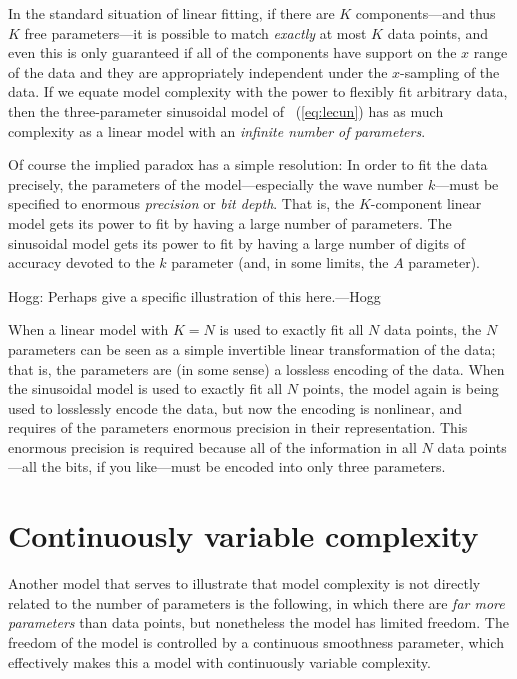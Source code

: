 \documentclass[12pt,twoside]{article}
\begin{document}
In the standard situation of linear fitting, if there are $K$
components---and thus $K$ free parameters---it is possible to match
\emph{exactly} at most $K$ data points, and even this is only
guaranteed if all of the components have support on the $x$ range of
the data and they are appropriately independent under the $x$-sampling
of the data.  If we equate model complexity with the power to flexibly
fit arbitrary data, then the three-parameter sinusoidal model of
\equationname~(\ref{eq:lecun}) has as much complexity as a linear
model with an \emph{infinite number of parameters}.

Of course the implied paradox has a simple resolution: In order to fit
the data precisely, the parameters of the model---especially the wave
number $k$---must be specified to enormous \emph{precision} or \emph{bit depth}.  That is,
the $K$-component linear model gets its power to fit by having a large
number of parameters.  The sinusoidal model gets its power to fit by
having a large number of digits of accuracy devoted to the $k$
parameter (and, in some limits, the $A$ parameter).

Hogg:  Perhaps give a specific illustration of this here.---Hogg

When a linear model with $K=N$ is used to exactly fit all $N$ data
points, the $N$ parameters can be seen as a simple invertible linear
transformation of the data; that is, the parameters are (in some
sense) a lossless encoding of the data.  When the sinusoidal model is
used to exactly fit all $N$ points, the model again is being used to
losslessly encode the data, but now the encoding is nonlinear, and
requires of the parameters enormous precision in their representation.
This enormous precision is required because all of the information in
all $N$ data points---all the bits, if you like---must be encoded into
only three parameters.

\section{Continuously variable complexity}

Another model that serves to illustrate that model complexity is not
directly related to the number of parameters is the following, in
which there are \emph{far more parameters} than data points, but
nonetheless the model has limited freedom.  The freedom of the model
is controlled by a continuous smoothness parameter, which effectively
makes this a model with continuously variable complexity.
\end{document}
